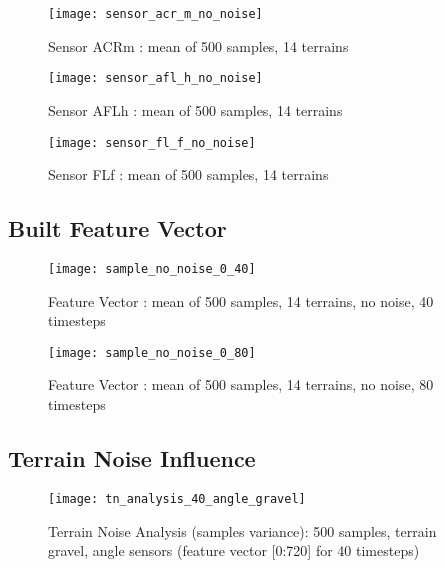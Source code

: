 \begin{figure}[H]
  \centering
  \texttt{[image: sensor\_acr\_m\_no\_noise]}
  \caption{Sensor ACRm : mean of 500 samples, 14 terrains}
  \label{fig:sensor_acr_m_no_noise}
\end{figure}

\begin{figure}[H]
  \centering
  \texttt{[image: sensor\_afl\_h\_no\_noise]}
  \caption{Sensor AFLh : mean of 500 samples, 14 terrains}
  \label{fig:sensor_afl_h_no_noise}
\end{figure}

\begin{figure}[H]
  \centering
  \texttt{[image: sensor\_fl\_f\_no\_noise]}
  \caption{Sensor FLf : mean of 500 samples, 14 terrains}
  \label{fig:sensor_fl_f_no_noise}
\end{figure}

\subsection{Built Feature Vector} \label{ssec:built_feature_vectors}

\begin{figure}[H]
  \centering
  \texttt{[image: sample\_no\_noise\_0\_40]}
  \caption{Feature Vector : mean of 500 samples, 14 terrains, no noise, 40 timesteps}
  \label{fig:sample_40t}
\end{figure}


\begin{figure}[H]
  \centering
  \texttt{[image: sample\_no\_noise\_0\_80]}
  \caption{Feature Vector : mean of 500 samples, 14 terrains, no noise, 80 timesteps}
  \label{fig:sample_80t}
\end{figure}

\subsection{Terrain Noise Influence} \label{ssec:terrain_noise_influence}

\begin{figure}[H]
  \centering
  \texttt{[image: tn\_analysis\_40\_angle\_gravel]}
  \caption{Terrain Noise Analysis (samples variance): 500 samples, terrain gravel, angle sensors (feature vector [0:720] for 40 timesteps)}
  \label{fig:tn_analysis_angle_gravel}
\end{figure}

